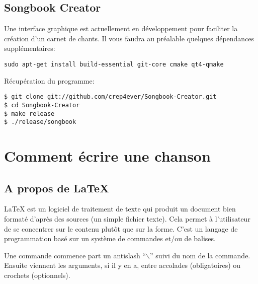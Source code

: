 \documentclass[a4paper,twoside]{article}
\begin{document}
\subsection{Songbook Creator}

Une interface graphique est actuellement en développement pour
faciliter la création d'un carnet de chants. Il vous faudra au
préalable quelques dépendances supplémentaires:

\begin{verbatim}
sudo apt-get install build-essential git-core cmake qt4-qmake
\end{verbatim}

Récupération du programme:

\begin{verbatim}
$ git clone git://github.com/crep4ever/Songbook-Creator.git
$ cd Songbook-Creator
$ make release
$ ./release/songbook
\end{verbatim}

\section{Comment écrire une chanson}

\subsection{A propos de LaTeX}

LaTeX est un logiciel de traitement de texte qui produit un document
bien formaté d'après des sources (un simple fichier texte). Cela
permet à l'utilisateur de se concentrer sur le contenu plutôt que sur
la forme. C'est un langage de programmation basé sur un système de
commandes et/ou de balises.

Une commande commence part un antislash ``$\backslash$'' suivi du nom
de la commande. Ensuite viennent les arguments, si il y en a, entre
accolades (obligatoires) ou crochets (optionnels).

\end{document}
